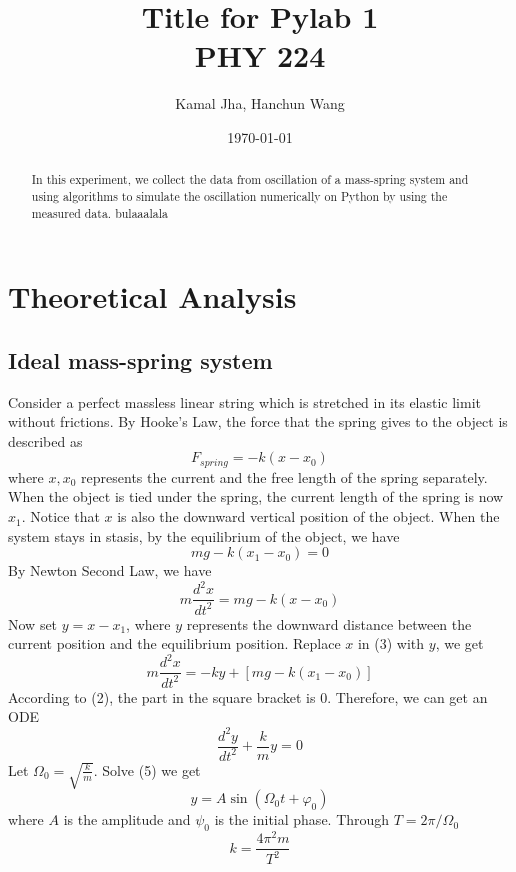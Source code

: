 \documentclass[11pt]{article}
\title{Title for Pylab 1\\ PHY 224} %
\author{Kamal Jha, Hanchun Wang} %
\date{\today} %
\begin{document}
\maketitle %


\begin{abstract}
	In this experiment, we collect the data from oscillation of a mass-spring system and using algorithms to simulate the oscillation numerically on Python by using the measured data. bulaaalala 
\end{abstract}



\section{Theoretical Analysis}
\subsection{Ideal mass-spring system}
Consider a perfect massless linear string which is stretched in its elastic limit without frictions. By Hooke's Law, the force that the spring gives to the object is described as 
\[{F_{spring}} =  - k(x - {x_0})\tag{1}\]
where $x, x_0$ represents the current and the free length of the spring separately. When the object is tied under the spring, the current length of the spring is now $x_1$. Notice that $x$ is also the downward vertical position of the object. When the system stays in stasis, by the equilibrium of the object, we have
\[mg - k({x_1} - {x_0}) = 0\tag{2}\]
By Newton Second Law, we have 
\[m\frac{{{d^2}x}}{{d{t^2}}} = mg - k(x - {x_0})\tag{3}\]
Now set $y = x - x_1$, where $y$ represents the downward distance between the current position and the equilibrium position. Replace $x$ in (3) with $y$, we get
\[m\frac{{{d^2}x}}{{d{t^2}}} =  - ky + [mg - k({x_1} - {x_0})]\tag{4}\]
According to (2), the part in the square bracket is $0$. Therefore, we can get an ODE
\[\frac{{{d^2}y}}{{d{t^2}}} + \frac{k}{m}y = 0\tag{5}\]
Let $\Omega_0=\sqrt{\frac{k}{m}}$. Solve (5) we get
\[y = A\sin ({\Omega _0}t + {\varphi _0})\tag{6}\]
where $A$ is the amplitude and $\psi_0$ is the initial phase. Through $T = 2\pi /{\Omega _0}$
\[k = \frac{{4{\pi ^2}m}}{{{T^2}}}\tag{7}\]
\end{document}
